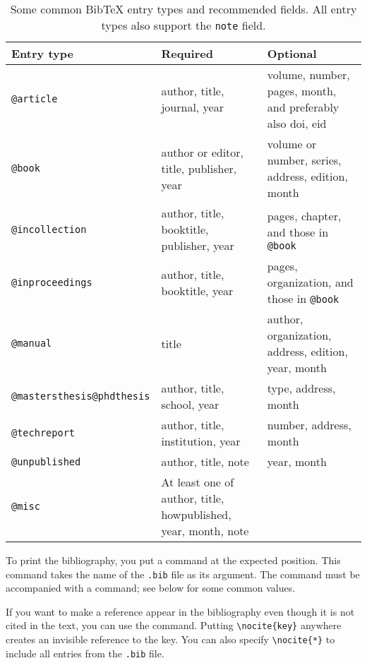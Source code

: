 \begin{table}
\centering
\begin{tabular}{>{\small} p{2.6cm}
    |>{\raggedright\small\ttfamily} p{4cm}
    |>{\raggedright\arraybackslash\small\ttfamily} p{4cm}}
\textbf{Entry type} & \textrm{\textbf{Required}} & \textrm{\textbf{Optional}}\\
\hline
{\verb|@article|}
& {author, title, journal, year}
& {volume, number, pages, month, \textrm{and preferably also} doi, eid}\\
\hline
{\verb|@book|}
& {author \textrm{or} editor, title, publisher, year}
& {volume \textrm{or} number, series, address, edition, month}\\
\hline
{\verb|@incollection|}
& {author, title, booktitle, publisher, year}
& {pages, chapter, \textrm{and those in \texttt{@book}}}\\
\hline
{\verb|@inproceedings|}
& {author, title, booktitle, year}
& {pages, organization, \textrm{and those in \texttt{@book}}}\\
\hline
{\verb|@manual|}
& {title}
& {author, organization, address, edition, year, month}\\
\hline
{\verb|@mastersthesis|\newline\verb|@phdthesis|}
& {author, title, school, year}
& {type, address, month}\\
\hline
{\verb|@techreport|}
& {author, title, institution, year}
& {number, address, month}\\
\hline
{\verb|@unpublished|}
& {author, title, note}
& {year, month}\\
\hline
{\verb|@misc|}
& {\textrm{At least one of} author, title, howpublished, year, month, note}
& {}
\end{tabular}
\caption{Some common BibTeX entry types and recommended fields.
All entry types also support the \texttt{note} field.}
\label{tbl:bib entries}
\end{table}

To print the bibliography, you put a  command at the expected position.
This command takes the name of the \verb|.bib| file as its argument.
The command must be accompanied with a  command;
see below for some common values.

If you want to make a reference appear in the bibliography even though it is not cited in the text,
you can use the  command.
Putting \verb|\nocite{key}| anywhere creates an invisible reference to the key.
You can also specify \verb|\nocite{*}| to include all entries from the \verb|.bib| file.

